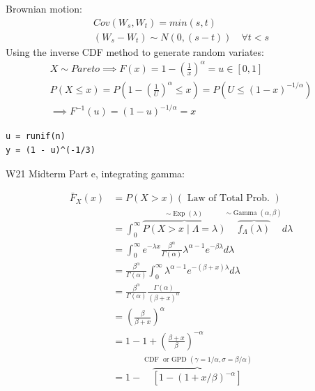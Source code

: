 \documentclass[
  oneside]{book}
\begin{document}
Brownian motion:
\[
\begin{gathered}
Cov(W_{s},W_{t}) = min(s,t)\\
(W_{s}-W_{t}) \sim N(0, (s-t)) \quad \forall t<s
\end{gathered}
\]
Using the inverse CDF method to generate random variates:
\[
\begin{gathered}
X \sim Pareto \implies F(x) = 1-\left( \frac{1}{x} \right)^{\alpha} = u \in [0,1]\\
P(X \leq x) = P(1-\left( \frac{1}{U} \right)^{\alpha} \leq x)=P(U \leq (1-x)^{-1/\alpha})\\
\implies F^{-1}(u) = (1-u)^{-1/\alpha} = x
\end{gathered}
\]

\begin{verbatim}
u = runif(n)
y = (1 - u)^(-1/3)
\end{verbatim}

W21 Midterm Part e, integrating gamma:

\[
\begin{aligned}
\bar{F}_X(x) & =P(X>x)(\text { Law of Total Prob. }) \\
& =\int_0^{\infty} \overbrace{P(X>x \mid \Lambda=\lambda)}^{\sim \operatorname{Exp}(\lambda)} \overbrace{f_{\Lambda}(\lambda)}^{\sim \operatorname{Gamma}(\alpha, \beta)} d \lambda \\
& =\int_0^{\infty} e^{-\lambda x} \frac{\beta^\alpha}{\Gamma(\alpha)} \lambda^{\alpha-1} e^{-\beta \lambda} d \lambda \\
& =\frac{\beta^\alpha}{\Gamma(\alpha)} \int_0^{\infty} \lambda^{\alpha-1} e^{-(\beta+x) \lambda} d \lambda \\
& =\frac{\beta^\alpha}{\Gamma(\alpha)} \frac{\Gamma(\alpha)}{(\beta+x)^\alpha} \\
& =\left(\frac{\beta}{\beta+x}\right)^\alpha \\
& =1-1+\left(\frac{\beta+x}{\beta}\right)^{-\alpha} \\
& =1-\overbrace{\left[1-(1+x / \beta)^{-\alpha}\right]}^{\operatorname{CDF} \text { or GPD }(\gamma=1 / \alpha, \sigma=\beta / \alpha)}
\end{aligned}
\]

  
\end{document}
